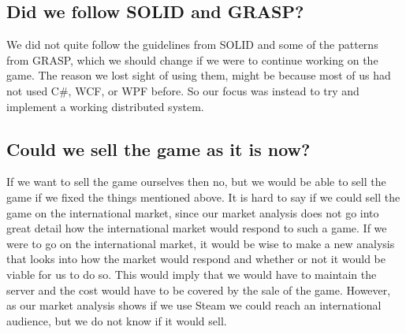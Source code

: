 	\subsection{Did we follow SOLID and GRASP?}
	We did not quite follow the guidelines from SOLID and some of the patterns
   from GRASP, which we should change if we were to continue working on the
    game. The reason we lost sight of using them, might be because most of
    us had not used C\#,  WCF, or WPF before. So our focus was instead to
    try and implement a working distributed system.
	\\
	\subsection{Could we sell the game as it is now?}
	If we want to sell the game ourselves then no, but we would be able to
  sell the game if we fixed the things mentioned above. It is hard to say
   if we could sell the game on the international market, since our market
    analysis does not go into great detail how the international market
     would respond to such a game. If we were to go on the international
     market, it would be wise to make a new analysis that looks into how
     the market would respond and whether or not it would be viable for us
      to do so. This would imply that we would have to maintain the server
       and the cost would have to be covered by the sale of the game. However,
        as our market analysis shows if we use Steam we could reach an
         international audience, but we do not know if it would sell.
